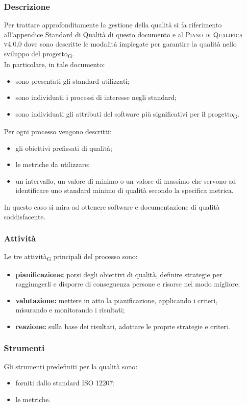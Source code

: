     \subsubsection{Descrizione}
    Per trattare approfonditamente la gestione della qualità si fa riferimento all'appendice Standard di Qualità di questo documento e al \textsc{Piano di Qualifica v4.0.0} dove sono descritte le modalità impiegate per garantire la qualità nello sviluppo del progetto\textsubscript{G}.\\In particolare, in tale documento:
    \begin{itemize}
    	\item sono presentati gli standard utilizzati;
    	\item sono individuati i processi di interesse negli standard;
    	\item sono individuati gli attributi del software più significativi per il progetto\textsubscript{G}.
    \end{itemize}
	Per ogni processo vengono descritti:
	\begin{itemize}
		\item gli obiettivi prefissati di qualità;
		\item le metriche da utilizzare;
		\item un intervallo, un valore di minimo o un valore di massimo che servono ad identificare uno standard minimo di qualità secondo la specifica metrica.
	\end{itemize}
	In questo caso si mira ad ottenere software e documentazione di qualità soddisfacente.
    \subsubsection{Attività}
    Le tre attività\textsubscript{G} principali del processo sono:
    \begin{itemize}
    	\item \textbf{pianificazione:} porsi degli obiettivi di qualità, definire strategie per raggiungerli e disporre di conseguenza persone e risorse nel modo migliore;
    	\item \textbf{valutazione:} mettere in atto la pianificazione, applicando i criteri, misurando e monitorando i risultati;
    	\item \textbf{reazione:} sulla base dei risultati, adottare le proprie strategie e criteri.
    \end{itemize}
	\subsubsection{Strumenti}
	Gli strumenti predefiniti per la qualità sono:
	\begin{itemize}
		\item forniti dallo standard ISO 12207;
		\item le metriche.
	\end{itemize}
